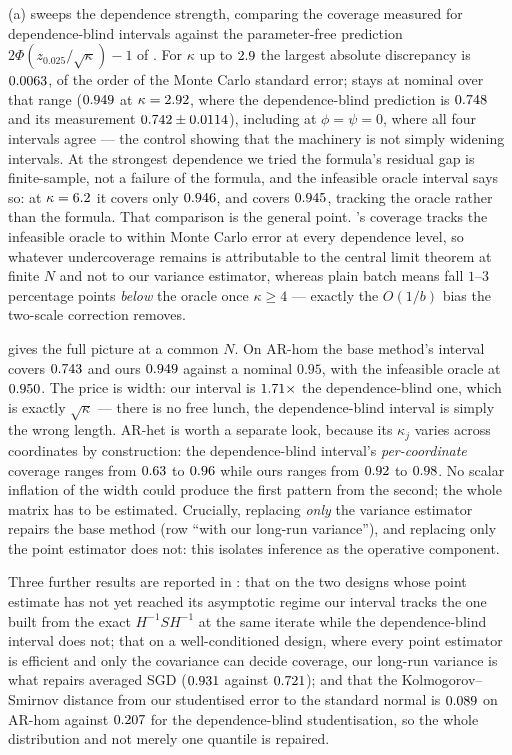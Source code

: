 (a) sweeps the dependence strength, comparing the coverage measured for
dependence-blind intervals against the parameter-free prediction $2\Phi(z_{0.025}/\sqrt{\kappa})-1$ of
. For $\kappa$ up to $2.9$ the largest absolute discrepancy is
$0.0063$, of the order of the Monte Carlo standard error; \bgsn{} stays at nominal over
that range ($0.949$ at $\kappa=2.92$, where the dependence-blind prediction is
$0.748$ and its measurement $0.742\pm0.0114$), including at $\phi=\psi=0$,
where all four intervals agree --- the control showing that the machinery is not simply widening
intervals. At the strongest dependence we tried the formula's residual gap is finite-sample, not a
failure of the formula, and the infeasible oracle interval says so: at $\kappa=6.2$ it
covers only $0.946$, and \bgsn{} covers $0.945$, tracking the oracle rather than
the formula. That comparison is the general point. \bgsn{}'s coverage tracks the infeasible oracle to
within Monte Carlo error at every dependence level, so whatever undercoverage remains is attributable
to the central limit theorem at finite $N$ and not to our variance estimator, whereas plain batch
means fall $1$--$3$ percentage points \emph{below} the oracle once $\kappa\ge4$ --- exactly the
$O(1/b)$ bias the two-scale correction removes.

 gives the full picture at a common $N$. On AR-hom the base method's interval covers
$0.743$ and ours $0.949$ against a nominal $0.95$, with the infeasible oracle at
$0.950$. The price is width: our interval is $1.71\times$ the dependence-blind
one, which is exactly $\sqrt{\kappa}$ --- there is no free lunch, the dependence-blind interval is
simply the wrong length. AR-het is worth a separate look, because its $\kappa_j$ varies across
coordinates by construction: the dependence-blind interval's \emph{per-coordinate} coverage ranges from
$0.63$ to $0.96$ while ours ranges from $0.92$ to
$0.98$. No scalar inflation of the width could produce the first pattern from the second;
the whole matrix has to be estimated. Crucially, replacing \emph{only} the variance estimator repairs
the base method (row ``with our long-run variance''), and replacing only the point estimator does not:
this isolates inference as the operative component.

Three further results are reported in : that on the two designs
whose point estimate has not yet reached its asymptotic regime our interval tracks the one built from the
exact $H^{-1}SH^{-1}$ at the same iterate while the dependence-blind interval does not; that on a
well-conditioned design, where every point estimator is efficient and only the covariance can decide
coverage, our long-run variance is what repairs averaged SGD ($0.931$ against
$0.721$); and that the Kolmogorov--Smirnov distance from our studentised error to the standard
normal is $0.089$ on AR-hom against $0.207$ for the dependence-blind studentisation, so
the whole distribution and not merely one quantile is repaired.

